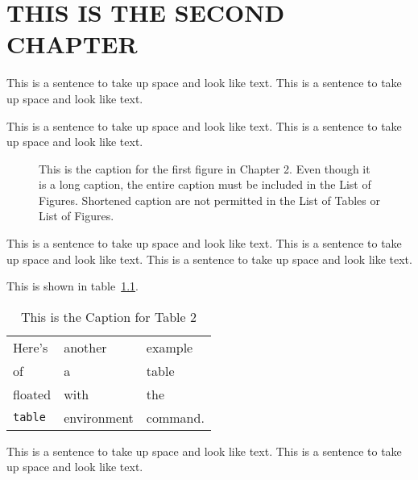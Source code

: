  
\chapter{THIS IS THE SECOND CHAPTER}
This is a sentence to take up space and look like text.
This is a sentence to take up space and look like text.
 
This is a sentence to take up space and look like text.
This is a sentence to take up space and look like text.

\begin{figure}
\centering
\vspace{2.0in}
\caption%
{This is the caption for the first figure in Chapter 2. Even though it
  is a long caption, the entire caption must be included in the List of
  Figures. Shortened caption are not permitted in the List of Tables
  or List of Figures.}
\end{figure}
 
This is a sentence to take up space and look like text.
This is a sentence to take up space and look like text.
This is a sentence to take up space and look like text.

This is shown in table~\ref{mytable}.  %
 
\begin{table}
\caption{This is the Caption for Table 2}
\label{mytable}        %
\begin{center}
\begin{tabular}{lll}
Here's       & another     & example  \\
of           & a           & table    \\
floated      & with        & the      \\
\verb+table+ & environment & command.
\end{tabular}
\end{center}
\end{table}
 
This is a sentence to take up space and look like text.
This is a sentence to take up space and look like text.
 
